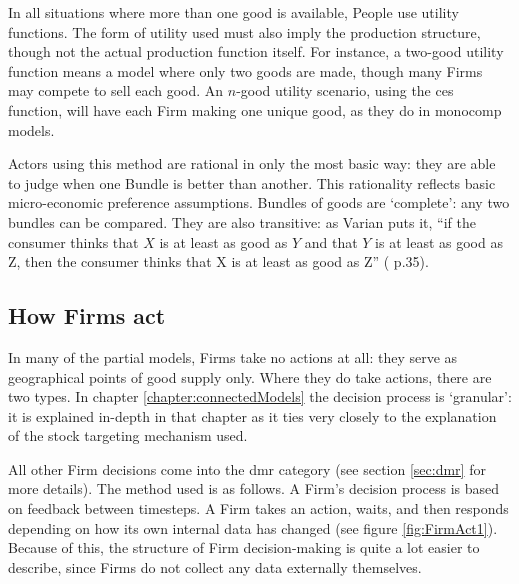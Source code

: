 In all situations where more than one good is available, People use utility functions. The form of utility used must also imply the production structure, though not the actual production function itself. For instance, a two-good utility function means a model where only two goods are made, though many Firms may compete to sell each good. An $n$-good utility scenario, using the \gls{ces} function, will have each Firm making one unique good, as they do in \gls{monocomp} models.

Actors using this method are rational in only the most basic way: they are able to judge when one Bundle is better than another. This rationality reflects basic micro-economic preference assumptions. Bundles of goods are `complete': any two bundles can be compared. They are also transitive: as Varian puts it, ``if the consumer thinks that $X$ is at least as good as $Y$ and that $Y$ is at least as good as Z, then the consumer thinks that X is at least as good as Z'' (\citealt{varian_intermediate_2006} p.35). 

\subsection{How Firms act \label{sec:howFirmsAct}}

In many of the partial models, Firms take no actions at all: they serve as geographical points of good supply only. Where they do take actions, there are two types. In chapter \ref{chapter:connectedModels} the decision process is `granular': it is explained in-depth in that chapter as it ties very closely to the explanation of the stock targeting mechanism used. 

All other Firm decisions come into the \gls{dmr} category (see section \ref{sec:dmr} for more details). The method used is as follows. A Firm's decision process is based on feedback between timesteps. A Firm takes an action, waits, and then responds depending on how its own internal data has changed (see figure \ref{fig:FirmAct1}). Because of this, the structure of Firm decision-making is quite a lot easier to describe, since Firms do not collect any data externally themselves. 

